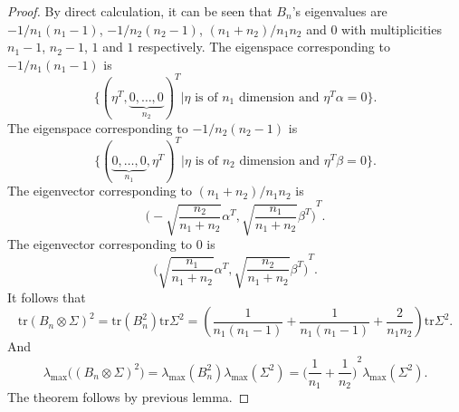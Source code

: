 \begin{theorem}
\begin{proof}
        By direct calculation, it can be seen that $B_n$'s eigenvalues are $-1/n_1(n_1-1)$, $-1/n_2(n_2-1)$, $(n_1+n_2)/n_1 n_2$ and $0$ with multiplicities $n_1-1$, $n_2-1$, $1$ and $1$ respectively.
        The eigenspace corresponding to $-1/n_1(n_1-1)$ is
        \begin{equation*}
            \{{(\eta^T,\underbrace{0,\ldots,0}_{n_2})}^T| \eta\,\, \textrm{is of}\,\, n_1\,\, \textrm{dimension and}\,\, \eta^T \alpha=0\}.
        \end{equation*}
        The eigenspace corresponding to $-1/n_2(n_2-1)$ is
        \begin{equation*}
            \{{(\underbrace{0,\ldots,0}_{n_1},\eta^T)}^T| \eta\,\, \textrm{is of}\,\, n_2\,\, \textrm{dimension and}\,\, \eta^T \beta=0\}.
        \end{equation*}
        The eigenvector corresponding to $(n_1+n_2)/n_1n_2$ is
        \begin{equation*}
            {\Big(-\sqrt{\frac{n_2}{n_1+n_2}}\alpha^T, \sqrt{\frac{n_1}{n_1+n_2}}\beta^T\Big)}^T.
        \end{equation*}
        The eigenvector corresponding to $0$ is
        \begin{equation*}
            {\Big(\sqrt{\frac{n_1}{n_1+n_2}}\alpha^T, \sqrt{\frac{n_2}{n_1+n_2}}\beta^T\Big)}^T.
        \end{equation*}
It follows that 
        \begin{equation*}
            \mathrm{tr}{(B_n\otimes \Sigma)}^2=\mathrm{tr}(B_n^2)\mathrm{tr}\Sigma^2=(\frac{1}{n_1(n_1-1)}+\frac{1}{n_1(n_1-1)}+\frac{2}{n_1 n_2})\mathrm{tr}\Sigma^2.
        \end{equation*}
And
        \begin{equation*}
            \lambda_{\max}\Big({(B_n\otimes \Sigma)}^2\Big)=\lambda_{\max}(B_n^2)\lambda_{\max}(\Sigma^2)={\Big(\frac{1}{n_1}+\frac{1}{n_2}\Big)}^2\lambda_{\max}(\Sigma^2).
        \end{equation*}
        The theorem follows by previous lemma.
    \end{proof}
\end{theorem}
